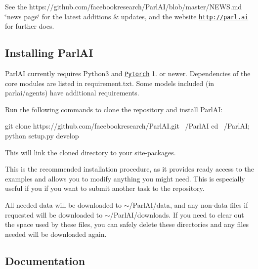 See the https\+://github.com/facebookresearch/\+Parl\+A\+I/blob/master/\+N\+E\+W\+S.\+md \char`\"{}news page\char`\"{} for the latest additions \& updates, and the website \href{http://parl.ai}{\tt http\+://parl.\+ai} for further docs.



\subsection*{Installing Parl\+AI}

Parl\+AI currently requires Python3 and \href{https://pytorch.org}{\tt Pytorch} 1. or newer. Dependencies of the core modules are listed in {\ttfamily requirement.\+txt}. Some models included (in {\ttfamily parlai/agents}) have additional requirements.

Run the following commands to clone the repository and install Parl\+AI\+:


\begin{DoxyCode}
git clone https://github.com/facebookresearch/ParlAI.git ~/ParlAI
cd ~/ParlAI; python setup.py develop
\end{DoxyCode}


This will link the cloned directory to your site-\/packages.

This is the recommended installation procedure, as it provides ready access to the examples and allows you to modify anything you might need. This is especially useful if you if you want to submit another task to the repository.

All needed data will be downloaded to {\ttfamily $\sim$/\+Parl\+A\+I/data}, and any non-\/data files if requested will be downloaded to {\ttfamily $\sim$/\+Parl\+A\+I/downloads}. If you need to clear out the space used by these files, you can safely delete these directories and any files needed will be downloaded again.

\subsection*{Documentation}


